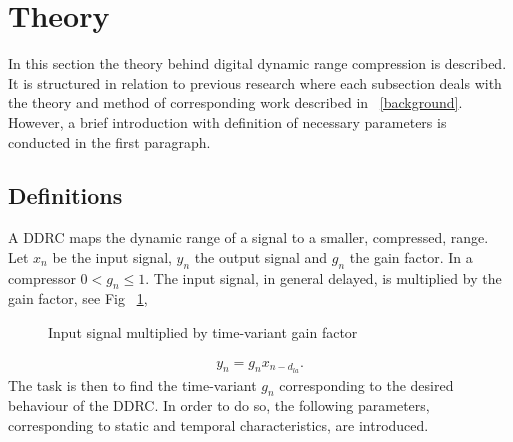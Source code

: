 \documentclass[../main2.tex]{subfiles}
\providecommand{\rootdir}{..}
\begin{document}
\section{Theory}\label{sec_theory}
In this section the theory behind digital dynamic range compression is described. It is structured in relation to previous research where each subsection deals with the theory and method of corresponding work described in ~\ref{background}. However, a brief introduction with definition of necessary parameters is conducted in the first paragraph. 

\subsection{Definitions} \label{theory_definitions}
A DDRC maps the dynamic range of a signal to a smaller, compressed, range. Let $x_n$ be the input signal, $y_n$ the output signal and $g_n$ the gain factor. In a compressor $0<g_n\leq 1$. The input signal, in general delayed, is multiplied by the gain factor, see Fig ~\ref{fig:block_gain},
\begin{figure}
\centerline{}
\caption{Input signal multiplied by time-variant gain factor}
\label{fig:block_gain}
\end{figure}
\begin{align}
y_n = g_nx_{n-d_{la}}.
\label{eq:gainfactor}
\end{align}
The task is then to find the time-variant $g_n$ corresponding to the desired behaviour of the DDRC. In order to do so, the following parameters, corresponding to static and temporal characteristics, are introduced.
\end{document}
